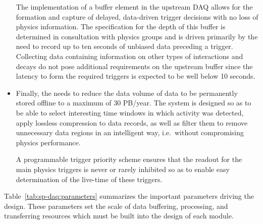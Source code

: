 \begin{itemize}
The implementation of a buffer element in the upstream DAQ allows for the formation and capture of delayed, data-driven trigger decisions with no loss of physics information.
The specification for the depth of this buffer is determined in consultation with physics groups and is driven primarily by the need to record up to ten seconds of unbiased data preceding a  trigger.
Collecting data containing information on other types of interactions and decays do not pose additional requirements on the upstream  buffer since the latency to form the required triggers is expected to be well below 10 seconds.

\item Finally, the  needs to reduce the data volume of data to be permanently stored offline to a maximum of 30 PB/year.
The  system is designed so as to be able to select interesting time windows in which activity was detected, apply lossless compression to data records, as well as filter them to remove unnecessary data regions in an intelligent way, i.e.~without compromising physics performance.

A programmable trigger priority scheme ensures that the readout for the main physics triggers is never or rarely inhibited so as to enable easy determination of the live-time of these triggers. 


\end{itemize}


Table~\ref{tab:sp-daq:parameters} summarizes the important parameters driving the  design. These parameters set the scale of data buffering, processing, and transferring resources which must be built into the design of each  module. 

